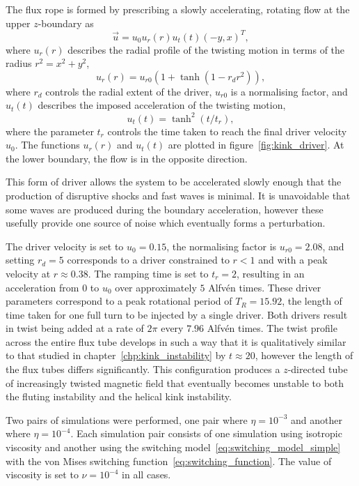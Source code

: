 The flux rope is formed by prescribing a slowly accelerating, rotating flow at the upper $z$-boundary as
\begin{equation}
  \label{eq:null_twisting_profile}
  \vec{u} = u_0 u_r(r) u_t(t) (-y, x)^T,
\end{equation}
where $u_r(r)$ describes the radial profile of the twisting motion in terms of the radius $r^2 = x^2 + y^2$,
\begin{equation}
  \label{eq:radial_twisting_function}
  u_r(r) = u_{r0}(1 + \tanh(1 - r_d r^2)),
\end{equation}
where $r_d$ controls the radial extent of the driver, $u_{r0}$ is a normalising factor, and $u_t(t)$ describes the imposed acceleration of the twisting motion,
\begin{equation}
  \label{eq:ramping_up_function}
  u_t(t) = \tanh^2(t/t_r),
\end{equation}
where the parameter $t_r$ controls the time taken to reach the final driver velocity $u_0$. The functions $u_r(r)$ and $u_t(t)$ are plotted in figure~\ref{fig:kink_driver}. At the lower boundary, the flow is in the opposite direction.

This form of driver allows the system to be accelerated slowly enough that the production of disruptive shocks and fast waves is minimal. It is unavoidable that some waves are produced during the boundary acceleration, however these usefully provide one source of noise which eventually forms a perturbation.

The driver velocity is set to $u_0 = 0.15$, the normalising factor is $u_{r0} = 2.08$, and setting $r_d = 5$ corresponds to a driver constrained to $r<1$ and with a peak velocity at $r\approx 0.38$. The ramping time is set to $t_r = 2$, resulting in an acceleration from $0$ to $u_0$ over approximately $5$ Alfv\'en times. These driver parameters correspond to a peak rotational period of $T_R = 15.92$, the length of time taken for one full turn to be injected by a single driver. Both drivers result in twist being added at a rate of $2\pi$ every $7.96$ Alfv\'en times. The twist profile across the entire flux tube develops in such a way that it is qualitatively similar to that studied in chapter~\ref{chp:kink_instability} by $t\approx 20$, however the length of the flux tubes differs significantly. This configuration produces a $z$-directed tube of increasingly twisted magnetic field that eventually becomes unstable to both the fluting instability and the helical kink instability.

Two pairs of simulations were performed, one pair where $\eta=10^{-3}$ and another where $\eta=10^{-4}$. Each simulation pair consists of one simulation using isotropic viscosity and another using the switching model~\eqref{eq:switching_model_simple} with the von Mises switching function~\eqref{eq:switching_function}. The value of viscosity is set to $\nu = 10^{-4}$ in all cases.

